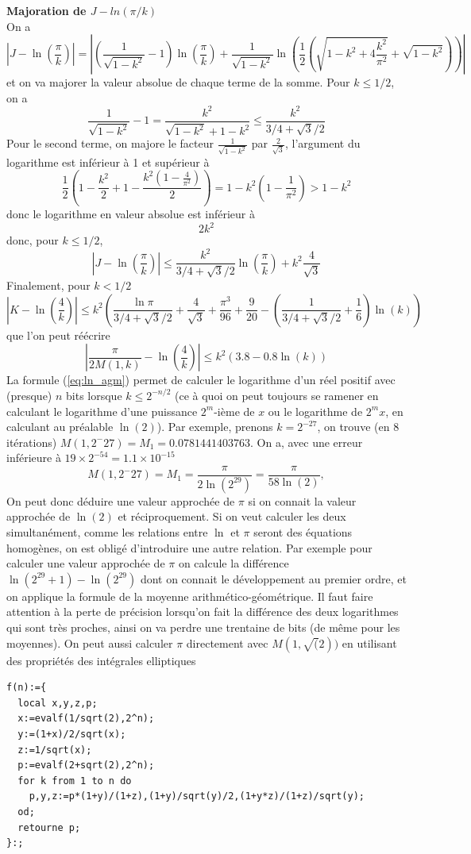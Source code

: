 \documentclass[a4paper,11pt]{article}
\begin{document}
{\bf Majoration de $J-ln(\pi/k)$}\\
On a
\[ |J - \ln\left(\frac{\pi}{k}\right)|
= \left| (\frac{1}{\sqrt{1-k^2}}-1) \ln\left(\frac{\pi}{k}\right)
+ \frac{1}{\sqrt{1-k^2}}
\ln\left( \frac{1}{2} \left(\sqrt{ 1-k^{2} +4 \frac{k^{2}}{\pi^2}} 
+\sqrt{1-k^{2}} \right) \right) \right| \]
et on va majorer la valeur absolue de chaque terme de la somme.
Pour $k\leq 1/2$, on a
\[ \frac{1}{\sqrt{1-k^2}}-1=\frac{k^2}{\sqrt{1-k^2}+1-k^2} \leq \frac{k^2}{3/4+\sqrt{3}/2} \]
Pour le second terme, on majore le facteur $\frac{1}{\sqrt{1-k^2}}$ par $\frac{2}{\sqrt{3}}$,
l'argument du logarithme est inférieur à 1 et supérieur à
\[ 
\frac{1}{2}(1 - \frac{k^2}{2} +1- \frac{k^2(1-\frac{4}{\pi^2})}{2})
= 1 - k^2 ( 1-\frac{1}{\pi^2}) > 1-k^2
\]
donc le logarithme en valeur absolue est inférieur à
\[ 2 k^2 \]
donc, pour $k\leq 1/2$,
\[ |J-\ln\left(\frac{\pi}{k}\right)| \leq 
\frac{k^2}{3/4+\sqrt{3}/2} \ln\left(\frac{\pi}{k}\right)
+ k^2 \frac{4}{\sqrt{3}} 
\]
Finalement, pour $k<1/2$
\begin{equation} \label{eq:ln_agm0}
 |K-\ln\left(\frac{4}{k}\right) | 
\leq k^2 \left( \frac{\ln \pi}{3/4+\sqrt{3}/2}  + \frac{4}{\sqrt{3} }
+ \frac{\pi^3}{96} + \frac{9}{20}
- (\frac{1}{3/4+\sqrt{3}/2}+\frac{1}{6}) \ln(k) \right) 
\end{equation}
que l'on peut réécrire
\begin{equation} \label{eq:ln_agm}
|\frac{\pi}{2M(1,k)}-\ln\left(\frac{4}{k}\right) |
\leq  k^2(3.8-0.8\ln(k))
\end{equation}
La formule (\ref{eq:ln_agm}) 
permet de calculer le logarithme d'un r\'eel positif
avec (presque) $n$ bits 
lorsque $k \leq 2^{-n/2}$ (ce \`a quoi on peut toujours se ramener
en calculant le logarithme d'une puissance $2^m$-i\`eme de $x$ ou
le logarithme de $2^{m}x$, en calculant au pr\'ealable $\ln(2)$).
Par exemple, prenons $k=2^{-27}$, on trouve (en 8 itérations)
$M(1,2^-{27})=M_1=0.0781441403763$. 
On a, avec une erreur inférieure à $19 \times 2^{-54}=1.1\times 10^{-15}$
\[ 
M(1,2^-{27})=M_1=\frac{\pi}{2\ln(2^{29})}=\frac{\pi}{58\ln(2)},
\] 
On peut donc d\'eduire une valeur approch\'ee de $\pi $ si on connait
la valeur approchée de $\ln(2)$ et réciproquement.
Si on veut calculer les deux simultan\'ement, comme les relations entre $\ln$
et $\pi$ seront des \'equations homog\`enes, on est oblig\'e
d'introduire une autre relation. Par exemple pour calculer une
valeur approch\'ee de $\pi$ on calcule la diff\'erence
$\ln(2^{29}+1)-\ln(2^{29})$ dont on connait le d\'eveloppement au premier
ordre, et on applique la formule de la moyenne arithm\'etico-g\'eom\'etrique.
Il faut faire attention \`a la perte de pr\'ecision lorsqu'on fait
la diff\'erence des deux logarithmes qui sont tr\`es proches, ainsi
on va perdre une trentaine de bits (de m\^eme pour les moyennes).
On peut aussi calculer $\pi$ directement avec $M(1,\sqrt(2))$ en
utilisant des propri\'et\'es des int\'egrales elliptiques
\begin{verbatim}
f(n):={
  local x,y,z,p;
  x:=evalf(1/sqrt(2),2^n);
  y:=(1+x)/2/sqrt(x);
  z:=1/sqrt(x);
  p:=evalf(2+sqrt(2),2^n);
  for k from 1 to n do
    p,y,z:=p*(1+y)/(1+z),(1+y)/sqrt(y)/2,(1+y*z)/(1+z)/sqrt(y);
  od;
  retourne p;
}:;
\end{verbatim}
\end{document}
